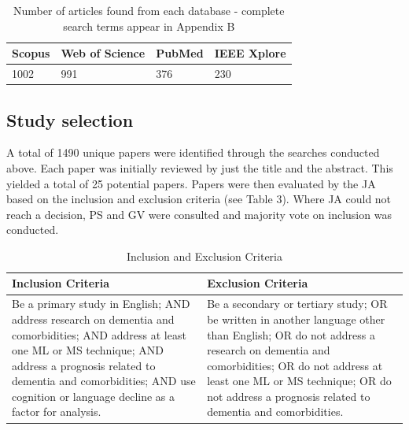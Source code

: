 \begin{table}[H]
	\begin{center}
	\begin{tabular}{ | p{3cm} | p{3cm} | p{3cm} | p{3cm} | }
	\hline
	Scopus & Web of Science & PubMed & IEEE Xplore \\ \hline
	1002 & 991 & 376 & 230 \\ 
	\hline
	\end{tabular}
	\end{center}
	\caption[Table caption text]{Number of articles found from each database - complete search terms appear in Appendix B}
	\label{table:name}
\end{table}

\subsection{Study selection} 
A total of 1490 unique papers were identified through the searches conducted above.  Each paper was initially reviewed by just the title and the abstract. This yielded a total of 25 potential papers. Papers were then evaluated by the JA based on the inclusion and exclusion criteria  (see Table 3). Where JA could not reach a decision, PS and GV were consulted and majority vote on inclusion was conducted.

\begin{table}[H]
	\begin{center}
	\begin{tabular}{ | p{6cm} | p{6cm} | }
	\hline
	Inclusion Criteria & Exclusion Criteria \\ \hline
	Be a primary study in English; AND address research on dementia and comorbidities; AND address at least one ML or MS technique; AND address a prognosis related to dementia and comorbidities; AND use cognition or language decline as a factor for analysis. &
	Be a secondary or tertiary study; OR be written in another language other than English; OR do not address a research on dementia and comorbidities; OR do not address at least one ML or MS technique; OR do not address a prognosis related to dementia and comorbidities. \\
	\hline 
	\end{tabular}
	\caption[Table caption text]{Inclusion and Exclusion Criteria}
	\label{table:name}
	\end{center}
\end{table}
 
